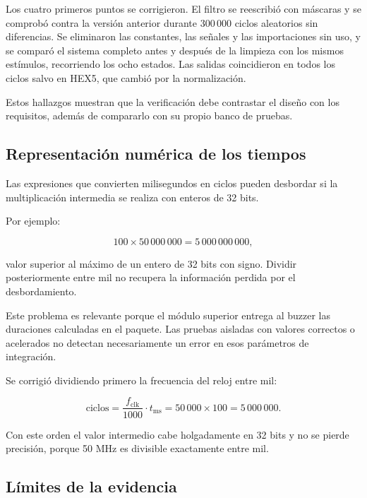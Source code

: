 \documentclass[12pt,letterpaper]{article}
\begin{document}
Los cuatro primeros puntos se corrigieron. El filtro se
reescribió con máscaras y se comprobó contra la versión
anterior durante 300\,000 ciclos aleatorios sin
diferencias. Se eliminaron las constantes, las señales y
las importaciones sin uso, y se comparó el sistema
completo antes y después de la limpieza con los mismos
estímulos, recorriendo los ocho estados. Las salidas
coincidieron en todos los ciclos salvo en HEX5, que
cambió por la normalización.

Estos hallazgos muestran que la verificación debe
contrastar el diseño con los requisitos, además de
compararlo con su propio banco de pruebas.

\subsection{Representación numérica de los tiempos}

Las expresiones que convierten milisegundos en ciclos
pueden desbordar si la multiplicación intermedia se
realiza con enteros de 32 bits.

Por ejemplo:

\begin{equation}
100 \times 50\,000\,000
=5\,000\,000\,000,
\end{equation}

valor superior al máximo de un entero de 32 bits
con signo. Dividir posteriormente entre mil no recupera
la información perdida por el desbordamiento.

Este problema es relevante porque el módulo superior
entrega al buzzer las duraciones calculadas en el paquete.
Las pruebas aisladas con valores correctos o acelerados
no detectan necesariamente un error en esos parámetros
de integración.

Se corrigió dividiendo primero la frecuencia del reloj
entre mil:

\begin{equation}
\text{ciclos} = \frac{f_{\mathrm{clk}}}{1000}\cdot t_{\mathrm{ms}}
= 50\,000 \times 100 = 5\,000\,000.
\end{equation}

Con este orden el valor intermedio cabe holgadamente en
32 bits y no se pierde precisión, porque 50 MHz es
divisible exactamente entre mil.

\subsection{Límites de la evidencia}
\end{document}

